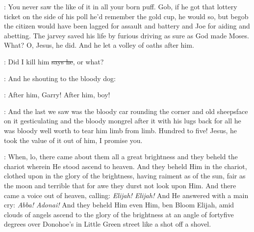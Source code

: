\Nq:
You never saw the like of it in all your born puff. Gob, if he got that
lottery ticket on the side of his poll he'd remember the gold cup,
he would so, but begob the citizen would have been lagged for assault
and battery and Joe for aiding and abetting. The jarvey saved his life
by furious driving as sure as God made Moses. What? O, Jesus, he did.
And he let a volley of oaths after him.

\citizen:
Did I kill him \sout{says he}, or what?

\Nq:
And he shouting to the bloody dog:

\citizen:
After him, Garry! After him, boy!

\Nq:
And the last we saw was the bloody car rounding the corner and old
sheepsface on it gesticulating and the bloody mongrel after it with his
lugs back for all he was bloody well worth to tear him limb from limb.
Hundred to five! Jesus, he took the value of it out of him,
I promise you.

:
When, lo, there came about them all a great brightness and they
beheld the chariot wherein He stood ascend to heaven. And they beheld
Him in the chariot, clothed upon in the glory of the brightness, having
raiment as of the sun, fair as the moon and terrible that for awe they
durst not look upon Him. And there came a voice out of heaven, calling:
\emph{Elijah! Elijah!} And He answered with a main cry:
\emph{Abba! Adonai!} And they
beheld Him even Him, ben Bloom Elijah, amid clouds of angels ascend
to the glory of the brightness at an angle of fortyfive degrees over
Donohoe's in Little Green street like a shot off a shovel.

